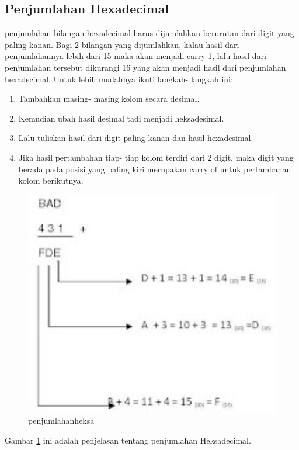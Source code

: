 	\subsection {Penjumlahan Hexadecimal}
	penjumlahan bilangan hexadecimal harus dijumlahkan berurutan dari digit yang paling kanan. Bagi 2 bilangan yang dijumlahkan, kalau hasil dari penjumlahannya lebih dari 15 maka akan menjadi carry 1, lalu hasil dari penjumlahan tersebut dikurangi 16 yang akan menjadi hasil dari penjumlahan hexadecimal.
	Untuk lebih mudahnya ikuti langkah- langkah ini:
		\begin{enumerate}
			\item Tambahkan masing- masing kolom secara desimal.
			\item Kemudian ubah hasil desimal tadi menjadi heksadesimal.
			\item Lalu tuliskan hasil dari digit paling kanan dan hasil hexadesimal.
			\item Jika hasil pertambahan tiap- tiap kolom terdiri dari 2 digit, maka digit yang berada pada posisi yang paling kiri merupakan carry of untuk pertambahan kolom berikutnya.
		\end{enumerate}
			\begin{figure} [ht]
				\centerline{\includegraphics[width=1\textwidth]{figures/penjumlahanheksa.jpg}}
				\caption{penjumlahanheksa}
				\label{penjumlahanheksa}
			\end{figure}
	Gambar \ref{penjumlahanheksa} ini adalah penjelasan tentang penjumlahan Heksadecimal.		
